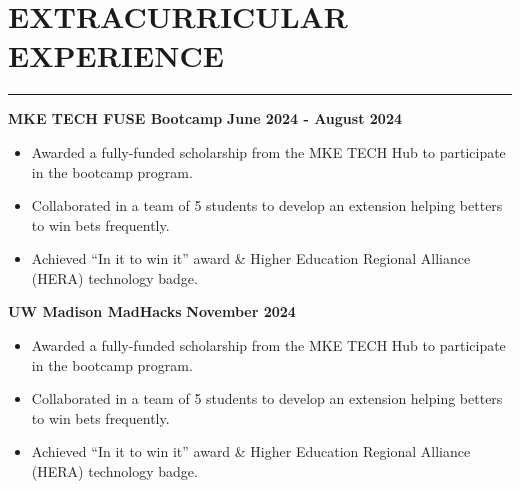 \documentclass[a4paper, 11pt]{article}
\begin{document}
\section*{EXTRACURRICULAR EXPERIENCE}
\vspace{-0.2cm}  
\hrule
\vspace{0.2cm}
\textbf{MKE TECH FUSE Bootcamp} \hfill \textbf{June 2024 - August 2024}
\vspace{-0.2cm}
\begin{itemize}[left=0pt]
    \setlength{\itemsep}{-0.2em}
    \item Awarded a fully-funded scholarship from the MKE TECH Hub to participate in the bootcamp program.
    \item Collaborated in a team of 5 students to develop an extension helping betters to win bets frequently.
    \item Achieved “In it to win it” award \& Higher Education Regional Alliance (HERA) technology badge.
\end{itemize}

\textbf{UW Madison MadHacks} \hfill \textbf{November 2024}
\vspace{-0.2cm}
\begin{itemize}[left=0pt]
    \setlength{\itemsep}{-0.2em}
    \item Awarded a fully-funded scholarship from the MKE TECH Hub to participate in the bootcamp program.
    \item Collaborated in a team of 5 students to develop an extension helping betters to win bets frequently.
    \item Achieved “In it to win it” award \& Higher Education Regional Alliance (HERA) technology badge.
\end{itemize}
\end{document}
